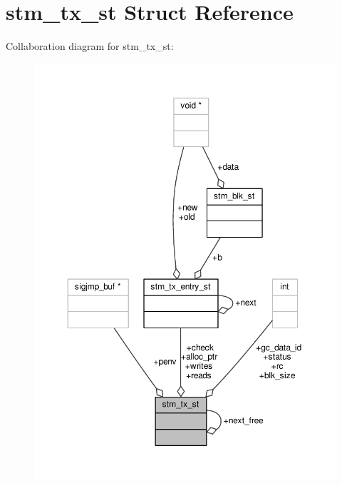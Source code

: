 \hypertarget{structstm__tx__st}{\section{stm\-\_\-tx\-\_\-st Struct Reference}
\label{structstm__tx__st}
}


Collaboration diagram for stm\-\_\-tx\-\_\-st\-:
\nopagebreak
\begin{figure}[H]
\begin{center}
\leavevmode
\includegraphics[width=350pt]{structstm__tx__st__coll__graph}
\end{center}
\end{figure}

